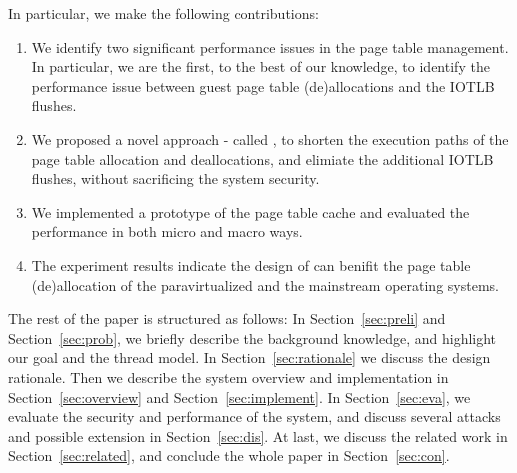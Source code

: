 In particular, we make the following contributions:
\begin{enumerate}
\item We identify two significant performance issues in the page table management. In particular, we are the first, to the best of our knowledge, to identify the performance issue between guest page table (de)allocations and the IOTLB flushes.
\item We proposed a novel approach - called \name, to shorten the execution paths of the page table allocation and deallocations, and elimiate the additional IOTLB flushes, without sacrificing the system security.
\item We implemented a prototype of the page table cache and evaluated the performance in both micro and macro ways.
\item The experiment results indicate the design of \name can benifit the page table (de)allocation of the paravirtualized and the mainstream operating systems.
\end{enumerate}

The rest of the paper is structured as follows: In Section~\ref{sec:preli} and Section~\ref{sec:prob}, we briefly describe the background knowledge, and highlight our goal and the thread model. In Section~\ref{sec:rationale} we discuss the design rationale. Then we describe the system overview and implementation in Section~\ref{sec:overview} and Section~\ref{sec:implement}. In Section~\ref{sec:eva}, we evaluate the security and performance of the system, and discuss several attacks and possible extension in Section~\ref{sec:dis}. At last, we discuss the related work in Section~\ref{sec:related}, and conclude the whole paper in Section~\ref{sec:con}.

